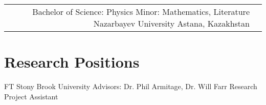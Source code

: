 \documentclass[10pt]{article} %
\begin{document}
\begin{paracol}{1}
\begin{supertabular}{rl}
	
	{Bachelor of Science:} %
	{Physics} %
	{Minor: Mathematics, Literature} %
	{Nazarbayev University} %
	{Astana, Kazakhstan}
	

\end{supertabular}

\section{Research Positions}




{FT} %
{Stony Brook University} %
{Advisors: Dr. Phil Armitage, Dr. Will Farr} %
{Research Project Assistant} %





\end{paracol}
\end{document}
